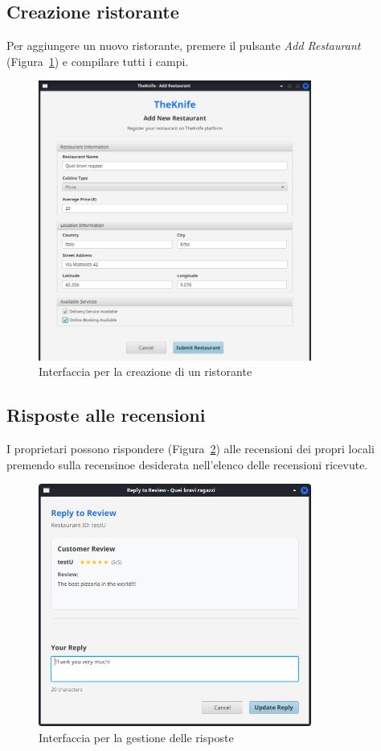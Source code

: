 \subsection{Creazione ristorante}
Per aggiungere un nuovo ristorante, premere il pulsante \emph{Add Restaurant} (Figura~\ref{fig:add-restaurant}) e compilare tutti i campi.
\begin{figure}[H]
    \centering
    \includegraphics[width=0.8\textwidth]{images/add-restaurant.png}
    \caption{Interfaccia per la creazione di un ristorante}
    \label{fig:add-restaurant}
\end{figure}

\subsection{Risposte alle recensioni}
I proprietari possono rispondere (Figura~\ref{fig:reply}) alle recensioni dei propri locali premendo 
sulla recensinoe desiderata nell'elenco delle recensioni ricevute.
\begin{figure}[H]
    \centering
    \includegraphics[width=0.8\textwidth]{images/reply.png}
    \caption{Interfaccia per la gestione delle risposte}
    \label{fig:reply}
\end{figure}
